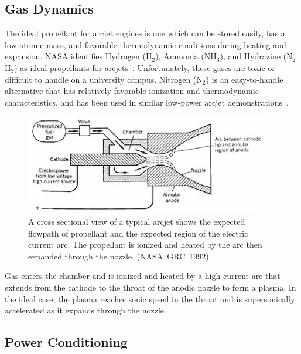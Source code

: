 \documentclass[journal]{IEEEtran}
\begin{document}
\subsection{Gas Dynamics}
The ideal propellant for arcjet engines is one which can be stored easily, has a low atomic mass, and favorable thermodynamic conditions during heating and expansion.
NASA identifies Hydrogen (H$_{2}$), Ammonia (NH$_{3}$), and Hydrazine (N$_{2}$H$_{3}$) as ideal propellants for arcjets~\cite{nasa1}.
Unfortunately, these gases are toxic or difficult to handle on a university campus.
Nitrogen (N$_{2}$) is an easy-to-handle alternative that has relatively favorable ionization and thermodynamic characteristics, and has been used in similar low-power arcjet demonstrations~\cite{olin,olinsim}.
\begin{figure}[htp]
  \centering
  \includegraphics[width=\linewidth]{figs/cross-section_nasa}
  \caption[Arcjet cross-section]{A cross sectional view of a typical arcjet shows the expected flowpath of propellant and the expected region of the electric current arc. The propellant is ionized and heated by the arc then expanded through the nozzle. (NASA~GRC~1992)
\label{fig:x-section-nasa}}
\end{figure}

Gas enters the chamber and is ionized and heated by a high-current arc that extends from the cathode to the throat of the anodic nozzle to form a plasma.
In the ideal case, the plasma reaches sonic speed in the throat and is supersonically accelerated as it expands through the nozzle.


\subsection{Power Conditioning}
\end{document}
